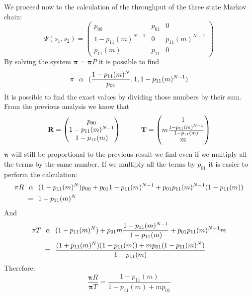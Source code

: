 We proceed now to the calculation of the throughput of the three state Markov chain:
$$\Psi(s_1,s_2)=
\begin{pmatrix}
		p_{00} & p_{01} & 0 \\
		1-p_{11}(m)^{N-1} & 0 & p_{11}(m)^{N-1} \\
		p_{11}(m) & p_{11} & 0
\end{pmatrix} $$
By solving the system $\mathbf{\pi} = \mathbf{\pi}P$ it is possible to find
$$\mathbf{\pi} \hspace{0.25 cm} \alpha \hspace{0.25cm} (\frac{1-p_{11}(m)^{N}}{p_{01}},1,1-p_{11}(m)^{N-1})$$
It is  possible to find the exact values by dividing those numbers by their sum. From the previous analysis we know that
$$\mathbf{R} =
\begin{pmatrix}
		p_{00}\\
	  1-p_{11}(m)^{N-1} \\
		1-p_{11}(m)
\end{pmatrix} \hspace{1 cm}
\mathbf{T} =
\begin{pmatrix}
		1 \\
		m \frac{1-p_{11}(m)^{N-1}}{1-p_{11}(m)} \\
		m
\end{pmatrix} $$
$\mathbf{\pi}$ will still be proportional to the previous result we find even if we multiply all the  terms by the same number. If we multiply all the terms by $p_{01}$ it is easier to perform the calculation:
\begin{equation}
	\begin{split}
		\mathbf{\pi}R \hspace{0.25 cm} \alpha &  \hspace{0.25cm}  (1-p_{11}(m)^{N})p_{00} + p_{01}1-p_{11}(m)^{N-1} + p_{01}p_{11}(m)^{N-1}(1-p_{11}(m))\\
		= & \hspace{0.25cm} 1 + p_{11}(m)^N
	\end{split}
\end{equation}
And
\begin{equation}
	\begin{split}
		\mathbf{\pi}T \hspace{0.25 cm} \alpha &  \hspace{0.25cm}  (1-p_{11}(m)^{N}) + p_{01}m\frac{1-p_{11}(m)^{N-1}}{1-p_{11}(m)} + p_{01}p_{11}(m)^{N-1}m\\
		= & \hspace{0.25cm} \frac{(1 + p_{11}(m)^N)(1-p_{11}(m))+mp_{01}(1-p_{11}(m)^N)}{1-p_{11}(m)}
	\end{split}
\end{equation}
Therefore:
\begin{equation}
		\frac{\mathbf{\pi}R}{\mathbf{\pi}T} = \frac{1-p_{11}(m)}{1-p_{11}(m)+ mp_{01}}
\end{equation}

